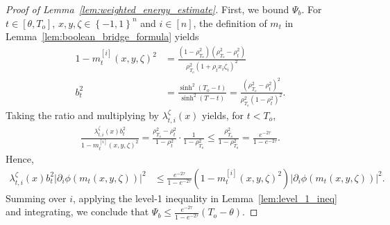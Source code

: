 \documentclass[11pt]{article}
\newcommand{\To}{{T_o}}
\theoremstyle{named}
\theoremstyle{plain}
\newcommand{\parenth}[1]{\left( #1 \right)}
\newcommand{\braces}[1]{\left\{ #1 \right \}}
\newcommand{\abss}[1]{\left| #1 \right |}
\begin{document}
\begin{proof}[Proof of Lemma~\ref{lem:weighted_energy_estimate}]
  First, we bound $\Psi_b$. For $t \in [\theta, \To]$, $x, y, \zeta \in \braces{-1, 1}^n$ and $i \in [n]$, the definition of $m_t$ in Lemma~\ref{lem:boolean_bridge_formula} yields 
  \begin{align*}
    1- m_t^{[i]}(x, y, \zeta)^2 &= \frac{(1-\rho_{\To}^2)(\rho_{\To}^2 - \rho_t^2)} {\rho_{\To}^2 (1+\rho_t x_i \zeta_i)^2} \\
    b_t^2 &= \frac{\sinh^2(\To-t)}{\sinh^2(T-t)} = \frac{(\rho_{\To}^2 - \rho_t^2)^2}{\rho_{\To}^2 (1-\rho_t^2)^2}.
  \end{align*}
  Taking the ratio and multiplying by $\lambda_{t, i}^{\zeta}(x)$ yields, for $t < \To$,
  \begin{align*}
    \frac{\lambda_{t, i}^{\zeta}(x) b_t^2}{1- m_t^{[i]}(x, y, \zeta)^2} = \frac{ \rho_{\To}^2 - \rho_t^2}{1-\rho_t^2} \cdot \frac{1}{1-\rho_{\To}^2} \leq \frac{\rho_{\To}^2}{1-\rho_{\To}^2} = \frac{e^{-2\tau}}{1-e^{-2\tau}}.
  \end{align*}
  Hence,
  \begin{align*}
    \lambda_{t, i}^{\zeta}(x) b_t^2 \abss{\partial_i \phi(m_t(x, y, \zeta))}^2 &\leq \frac{e^{-2\tau}}{1-e^{-2\tau}} \parenth{1- m_t^{[i]}(x, y, \zeta)^2} \abss{\partial_i \phi(m_t(x, y, \zeta))}^2.
  \end{align*}
  Summing over $i$, applying the level-1 inequality in Lemma~\ref{lem:level_1_ineq} and integrating, we conclude that $\Psi_b \leq \frac{e^{-2\tau}}{1-e^{-2\tau}} (\To - \theta)$.


\end{proof}
\end{document}
